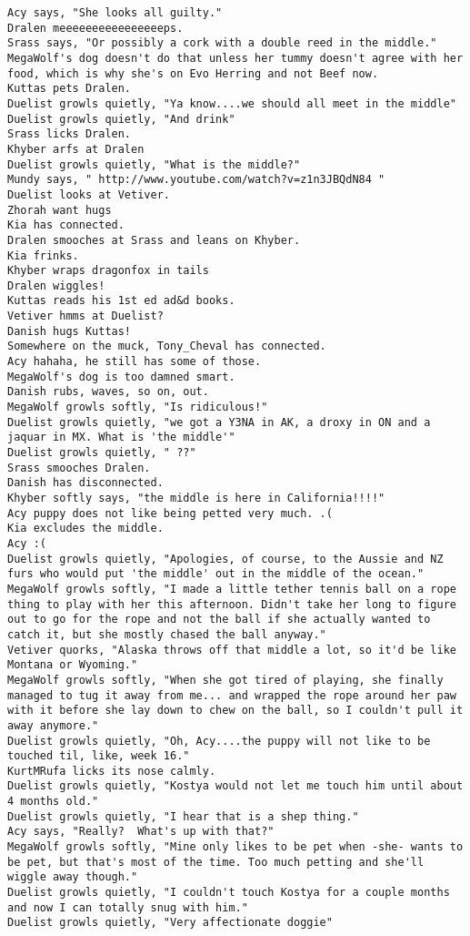 \begin{verbatim}
Acy says, "She looks all guilty."
Dralen meeeeeeeeeeeeeeeeps.
Srass says, "Or possibly a cork with a double reed in the middle."
MegaWolf's dog doesn't do that unless her tummy doesn't agree with her food, which is why she's on Evo Herring and not Beef now.
Kuttas pets Dralen.
Duelist growls quietly, "Ya know....we should all meet in the middle"
Duelist growls quietly, "And drink"
Srass licks Dralen.
Khyber arfs at Dralen
Duelist growls quietly, "What is the middle?"
Mundy says, " http://www.youtube.com/watch?v=z1n3JBQdN84 "
Duelist looks at Vetiver.
Zhorah want hugs
Kia has connected.
Dralen smooches at Srass and leans on Khyber.
Kia frinks.
Khyber wraps dragonfox in tails
Dralen wiggles!
Kuttas reads his 1st ed ad&d books.
Vetiver hmms at Duelist?
Danish hugs Kuttas!
Somewhere on the muck, Tony_Cheval has connected.
Acy hahaha, he still has some of those.
MegaWolf's dog is too damned smart.
Danish rubs, waves, so on, out.
MegaWolf growls softly, "Is ridiculous!"
Duelist growls quietly, "we got a Y3NA in AK, a droxy in ON and a jaquar in MX. What is 'the middle'"
Duelist growls quietly, " ??"
Srass smooches Dralen.
Danish has disconnected.
Khyber softly says, "the middle is here in California!!!!"
Acy puppy does not like being petted very much. .(
Kia excludes the middle.
Acy :(
Duelist growls quietly, "Apologies, of course, to the Aussie and NZ furs who would put 'the middle' out in the middle of the ocean."
MegaWolf growls softly, "I made a little tether tennis ball on a rope thing to play with her this afternoon. Didn't take her long to figure out to go for the rope and not the ball if she actually wanted to catch it, but she mostly chased the ball anyway."
Vetiver quorks, "Alaska throws off that middle a lot, so it'd be like Montana or Wyoming."
MegaWolf growls softly, "When she got tired of playing, she finally managed to tug it away from me... and wrapped the rope around her paw with it before she lay down to chew on the ball, so I couldn't pull it away anymore."
Duelist growls quietly, "Oh, Acy....the puppy will not like to be touched til, like, week 16."
KurtMRufa licks its nose calmly.
Duelist growls quietly, "Kostya would not let me touch him until about 4 months old."
Duelist growls quietly, "I hear that is a shep thing."
Acy says, "Really?  What's up with that?"
MegaWolf growls softly, "Mine only likes to be pet when -she- wants to be pet, but that's most of the time. Too much petting and she'll wiggle away though."
Duelist growls quietly, "I couldn't touch Kostya for a couple months and now I can totally snug with him."
Duelist growls quietly, "Very affectionate doggie"

\end{verbatim}
